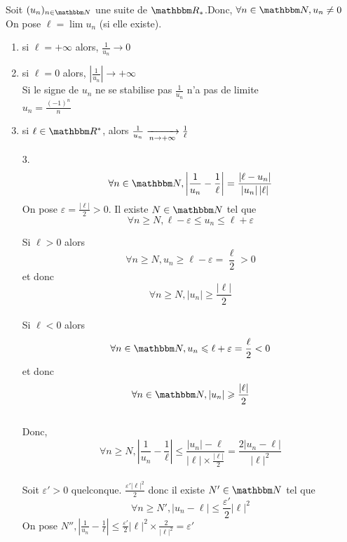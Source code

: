 \begin{prop}
	Soit $(u_n)_{n\in \N}$ une suite de $\R_*$.Donc, $\forall n \in \N, u_n \neq  0$\\
	On pose $\ell=\lim u_n$ (si elle existe).
	\begin{enumerate}
		\item si $\ell = +\infty$ alors, $\frac{1}{u_n}\to 0$
		\item si $\ell=0$ alors, $\left| \frac{1}{u_n} \right|  \to  +\infty$\\
			\danger Si le signe de  $u_n$ ne se stabilise pas $\frac{1}{u_n}$ n'a pas de limite\\
			\ex $u_n = \frac{(-1)^n}{n}$
		\item si $\ell\in \R^*$, alors $\frac{1}{u_n} \xrightarrow[n\to+\infty]{} \frac{1}{\ell}$
	\end{enumerate}
\end{prop}

\begin{prv}
	\begin{enumerate}
		\item[3.]
			\[
			\forall n\in \N, \left| \frac{1}{u_n} - \frac{1}{\ell} \right| = \frac{\left| \ell-u_n \right|}{\left| u_n \right| \left| \ell \right|}\\
			\] 
			On pose $\varepsilon = \frac{\left| \ell\right|}{2} > 0 $. Il existe $N \in \N$ tel que \[
			\forall n \ge  N, \ell- \varepsilon \le  u_n \le  \ell+\varepsilon
			\]

			Si $\ell >0$ alors \[
			 \forall n \ge  N, u_n \ge  \ell- \varepsilon = \frac{\ell}{2} >0
			\] et donc  \[
			 \forall n\ge N, \left| u_n \right|  \ge \frac{\left| \ell \right|}{2}
			\]\\
			Si $\ell < 0$ alors \[
			\forall n\in \N, u_n \le  \ell + \varepsilon = \frac{\ell}{2} < 0
			\] et donc \[
			\forall n \in \N, \left| u_n \right| \ge  \frac{\left| \ell \right|}{2}
			\]\\

			Donc, \[
			\forall n \ge N, \left| \frac{1}{u_n} - \frac{1}{\ell} \right| \le \frac{\left| u_n \right|  - \ell}{\left| \ell \right| \times  \frac{\left| \ell \right| }{2}} = \frac{2\left| u_n-\ell \right| }{\left| \ell \right| ^2}
			\]\\
			Soit $\varepsilon'>0$ quelconque. $\frac{\varepsilon'\left| \ell \right| ^2}{2}$ donc il existe $N' \in \N$ tel que \[
			\forall n \ge N', \left| u_n - \ell \right| \le  \frac{\varepsilon'}{2}\left| \ell \right| ^2
			\]
			On pose $N'', \left| \frac{1}{u_n}-\frac{1}{\ell} \right|  \le \frac{\varepsilon'}{2} \left| \ell \right| ^2 \times \frac{2}{\left| \ell \right| ^2} = \varepsilon'$
	\end{enumerate}
\end{prv}
